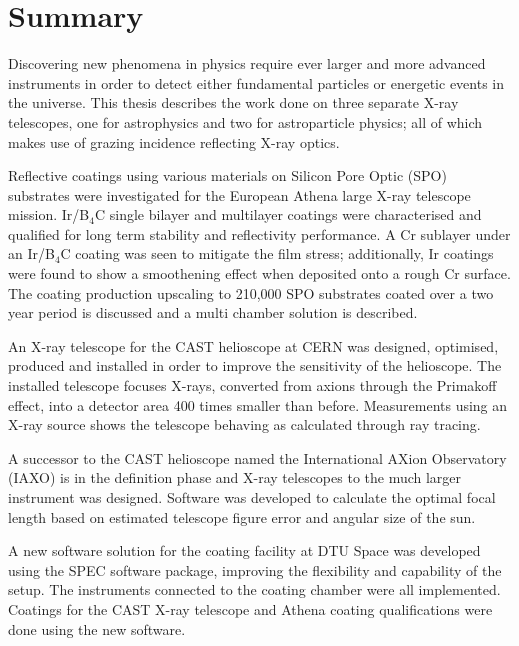 \chapter{Summary}
Discovering new phenomena in physics require ever larger and more advanced instruments in order to detect either fundamental particles or energetic events in the universe. This thesis describes the work done on three separate X-ray telescopes, one for astrophysics and two for astroparticle physics; all of which makes use of grazing incidence reflecting X-ray optics.

Reflective coatings using various materials on Silicon Pore Optic (SPO) substrates were investigated for the European Athena large X-ray telescope mission. Ir/B$_4$C single bilayer and multilayer coatings were characterised and qualified for long term stability and reflectivity performance. A Cr sublayer under an Ir/B$_4$C coating was seen to mitigate the film stress; additionally, Ir coatings were found to show a smoothening effect when deposited onto a rough Cr surface. The coating production upscaling to 210,000 SPO substrates coated over a two year period is discussed and a multi chamber solution is described.

An X-ray telescope for the CAST helioscope at CERN was designed, optimised, produced and installed in order to improve the sensitivity of the helioscope. The installed telescope focuses X-rays, converted from axions through the Primakoff effect, into a detector area 400 times smaller than before. Measurements using an X-ray source shows the telescope behaving as calculated through ray tracing.

A successor to the CAST helioscope named the International AXion Observatory (IAXO) is in the definition phase and X-ray telescopes to the much larger instrument was designed. Software was developed to calculate the optimal focal length based on estimated telescope figure error and angular size of the sun.

A new software solution for the coating facility at DTU Space was developed using the SPEC software package, improving the flexibility and capability of the setup. The instruments connected to the coating chamber were all implemented. Coatings for the CAST X-ray telescope and Athena coating qualifications were done using the new software.
